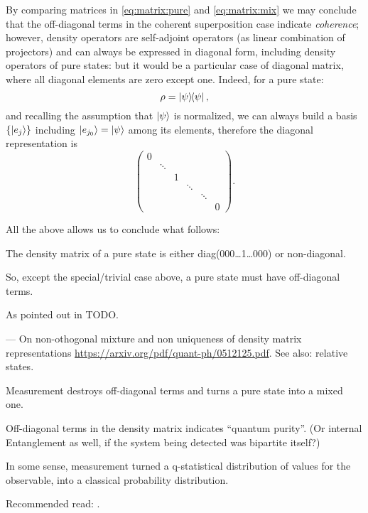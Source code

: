 By comparing matrices in \eqref{eq:matrix:pure} and \eqref{eq:matrix:mix}
we may conclude that the off-diagonal terms in the coherent superposition case
indicate \emph{coherence}; however, density operators are self-adjoint operators
(as linear combination of projectors) and can always be expressed in
diagonal form, including density operators of pure states: but it would be
a particular case of diagonal matrix, where all diagonal elements are zero
except one. Indeed, for a pure state:
\[
  \rho = \ketbra{\psi}{\psi}\text{,}
\]
and recalling the assumption that $\ket{\psi}$ is normalized,
we can always build a basis $\qty{\ket{e_j}}$ including $\ket{e_{j_0}} = \ket{\psi}$
among its elements, therefore the diagonal representation is
\[
  \begin{pmatrix}
    0           &       &       &       &       &           \\
                &\ddots &       &       &       &           \\
                &       &1      &       &       &           \\
                &       &       &\ddots &       &           \\
                &       &       &       &\ddots &           \\
                &       &       &       &       &0
  \end{pmatrix}\text{.}
\]

All the above allows us to conclude what follows:
\begin{remark}
  The density matrix of a pure state is either diag(000\dots1\dots000) or non-diagonal.

  So, except the special/trivial case above, a pure state must have off-diagonal terms.
\end{remark}

As pointed out in \cite{NielsenChuang} TODO.

%

--- On non-othogonal mixture and non uniqueness of density matrix representations
\url{https://arxiv.org/pdf/quant-ph/0512125.pdf}. See also: relative states.



Measurement destroys off-diagonal terms and turns a pure state into a mixed one.

Off-diagonal terms in the density matrix indicates ``quantum purity''.
(Or internal Entanglement as well, if the system being detected was bipartite itself?)

In some sense, measurement turned a q-statistical distribution of values for the observable,
into a classical probability distribution.

Recommended read: \cite{Zurek_Decoherence, Zurek_Fundamentals}.
